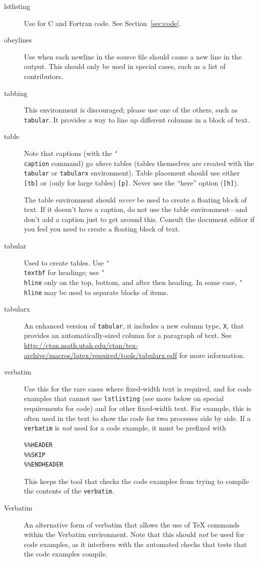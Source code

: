 \documentclass[letterpaper,twoside,11pt,fleqn]{article}
\def\cmd#1{\texttt{\char`\\#1}}
\def\flushline{\hfill\hbox{}\linebreak}
\begin{document}
\begin{description}
\item[lstlisting]Use for C and Fortran code. See Section~\ref{sec:code}.
\item[obeylines]Use when each newline in the source file should cause
  a new line in the output.  This should only be used in special
  cases, such as a list of contributors.
\item[tabbing]This environment is discouraged; please use one of the
  others, such as \verb+tabular+.  It provides a way to line up
  different columns in a block of text.
\item[table]Note that captions (with the \cmd{caption} command) go
  \emph{above} tables (tables themselves are created with the
  \texttt{tabular} or \texttt{tabularx} environment).
Table placement should use either
  \verb+[tb]+ or (only for large tables) \verb+[p]+.  Never use the
  ``here'' option (\verb+[h]+).

The table environment should \emph{never} be used to create a floating
block of text.
If it doesn't have a caption, do not use the table environment---and
don't add a caption just to get around this.
Consult the document editor if you feel you need to create a floating
block of text.

\item[tabular]Used to create tables. Use \cmd{textbf} for headings; use
 \cmd{hline} only on the top, bottom, and after then heading. In some case,
 \cmd{hline} may be used to separate blocks of items.
\item[tabularx]An enhanced version of \verb+tabular+, it includes a new
column type, \verb+X+, that provides an automatically-sized column for a
paragraph of text.
See \url{http://ctan.math.utah.edu/ctan/tex-archive/macros/latex/required/tools/tabularx.pdf}\flushline
for more information.
\item[verbatim]Use this for the rare cases where fixed-width text is
  required, and for code examples that cannot use \verb+lstlisting+
  (see more below on special
requirements for code) and for other fixed-width text.  For example,
this is often used in the text to show the code for two processes side
by side.  If a \verb+verbatim+ is \emph{not} used for a code example,
it must be prefixed with
\begin{verbatim}
%%HEADER
%%SKIP
%%ENDHEADER
\end{verbatim}
This keeps the tool that checks the code examples from trying to
compile the contents of the \verb+verbatim+.
\item[Verbatim]An alternative form of verbatim that allows the use of
  TeX commands within the Verbatim environment.  Note that this should
  \emph{not} be used for code examples, as it interferes with the automated
  checks that tests that the code examples compile.
\end{description}
\end{document}

